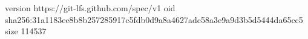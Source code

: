 version https://git-lfs.github.com/spec/v1
oid sha256:31a1183ee8b8b257285917c5fdb0d9a8a4627adc58a3e9a9d3b5d5444da65cc5
size 114537
